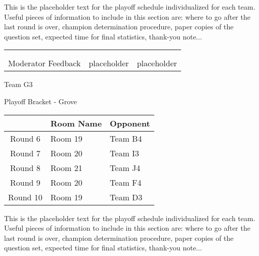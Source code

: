 \documentclass{article}%
\begin{document}
\vspace*{30pt}%
\linebreak%
This is the placeholder text for the playoff schedule individualized for each team. Useful pieces of information to include in this section are: where to go after the last round is over, champion determination procedure, paper copies of the question set, expected time for final statistics, thank{-}you note...%
\vspace*{30pt}%
\newline%
%
\begin{tabularx}{\textwidth}{YYY}%
  &  &  \\%
\\%
Moderator Feedback&placeholder&placeholder\\%
\end{tabularx}%
\newpage%
\begin{center}%
\begin{Huge}%
Team G3%
\end{Huge}%
\vspace*{12pt}%
\linebreak%
\begin{Large}%
Playoff Bracket {-} Grove%
\end{Large}%
\end{center}%
\vspace*{4pt}%
%
\begin{tabularx}{\textwidth}{|c|Y|Y|}%
\hline%
&Room Name&Opponent\\%
\hline%
Round 6&Room 19&Team B4\\%
Round 7&Room 20&Team I3\\%
Round 8&Room 21&Team J4\\%
Round 9&Room 20&Team F4\\%
Round 10&Room 19&Team D3\\%
\hline%
\end{tabularx}%
\vspace*{30pt}%
\linebreak%
This is the placeholder text for the playoff schedule individualized for each team. Useful pieces of information to include in this section are: where to go after the last round is over, champion determination procedure, paper copies of the question set, expected time for final statistics, thank{-}you note...%
\vspace*{30pt}%
\end{document}
